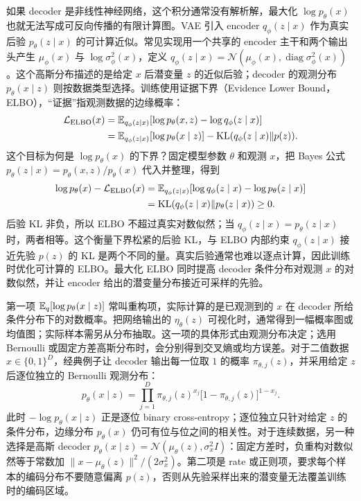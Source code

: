 如果 decoder 是非线性神经网络，这个积分通常没有解析解，最大化 \(\log p_\theta(x)\) 也就无法写成可反向传播的有限计算图。VAE 引入 encoder \(q_\phi(z\mid x)\) 作为真实后验 \(p_\theta(z\mid x)\) 的可计算近似。常见实现用一个共享的 encoder 主干和两个输出头产生 \(\mu_\phi(x)\) 与 \(\log\sigma_\phi^2(x)\)，定义 \(q_\phi(z\mid x)=\mathcal N\!\left(\mu_\phi(x),\operatorname{diag}\sigma_\phi^2(x)\right)\)。这个高斯分布描述的是给定 \(x\) 后潜变量 \(z\) 的近似后验；decoder 的观测分布 \(p_\theta(x\mid z)\) 则按数据类型选择。训练使用证据下界（Evidence Lower Bound，ELBO），“证据”指观测数据的边缘概率：
\begin{equation}
\begin{aligned}
 \mathcal L_{\mathrm{ELBO}}(x)
 &=\mathbb{E}_{q_\phi(z\mid x)}[\log p_\theta(x,z)-\log q_\phi(z\mid x)]\\
 &=\mathbb{E}_{q_\phi(z\mid x)}[\log p_\theta(x\mid z)]-\mathrm{KL}(q_\phi(z\mid x)\Vert p(z)).
\end{aligned}
\end{equation}
这个目标为何是 \(\log p_\theta(x)\) 的下界？固定模型参数 \(\theta\) 和观测 \(x\)，把 Bayes 公式 \(p_\theta(z\mid x)=p_\theta(x,z)/p_\theta(x)\) 代入并整理，得到
\begin{equation}
\begin{aligned}
 \log p_\theta(x)-\mathcal L_{\mathrm{ELBO}}(x)
 &=\mathbb{E}_{q_\phi(z\mid x)}[\log q_\phi(z\mid x)-\log p_\theta(z\mid x)]\\
 &=\mathrm{KL}(q_\phi(z\mid x)\Vert p_\theta(z\mid x))\geq0.
\end{aligned}
\end{equation}
后验 KL 非负，所以 ELBO 不超过真实对数似然；当 \(q_\phi(z\mid x)=p_\theta(z\mid x)\) 时，两者相等。这个衡量下界松紧的后验 KL，与 ELBO 内部约束 \(q_\phi(z\mid x)\) 接近先验 \(p(z)\) 的 KL 是两个不同的量。真实后验通常也难以逐点计算，因此训练时优化可计算的 ELBO。最大化 ELBO 同时提高 decoder 条件分布对观测 \(x\) 的对数似然，并让 encoder 给出的潜变量分布接近可采样的先验。

第一项 \(\mathbb{E}_q[\log p_\theta(x\mid z)]\) 常叫重构项，实际计算的是已观测到的 \(x\) 在 decoder 所给条件分布下的对数概率。把网络输出的 \(\eta_\theta(z)\) 可视化时，通常得到一幅概率图或均值图；实际样本需另从分布抽取。这一项的具体形式由观测分布决定；选用 Bernoulli 或固定方差高斯分布时，会分别得到交叉熵或均方误差。对于二值数据 \(x\in\{0,1\}^D\)，经典例子让 decoder 输出每一位取 \(1\) 的概率 \(\pi_{\theta,j}(z)\)，并采用给定 \(z\) 后逐位独立的 Bernoulli 观测分布：
\begin{equation}
 p_\theta(x\mid z)=\prod_{j=1}^{D}\pi_{\theta,j}(z)^{x_j}\bigl[1-\pi_{\theta,j}(z)\bigr]^{1-x_j}.
\end{equation}
此时 \(-\log p_\theta(x\mid z)\) 正是逐位 binary cross-entropy；逐位独立只针对给定 \(z\) 的条件分布，边缘分布 \(p_\theta(x)\) 仍可有位与位之间的相关性。对于连续数据，另一种选择是高斯 decoder \(p_\theta(x\mid z)=\mathcal N(\mu_\theta(z),\sigma_x^2I)\)：固定方差时，负重构对数似然等于常数加 \(\|x-\mu_\theta(z)\|^2/(2\sigma_x^2)\)。第二项是 rate 或正则项，要求每个样本的编码分布不要随意偏离 \(p(z)\)，否则从先验采样出来的潜变量无法覆盖训练时的编码区域。

